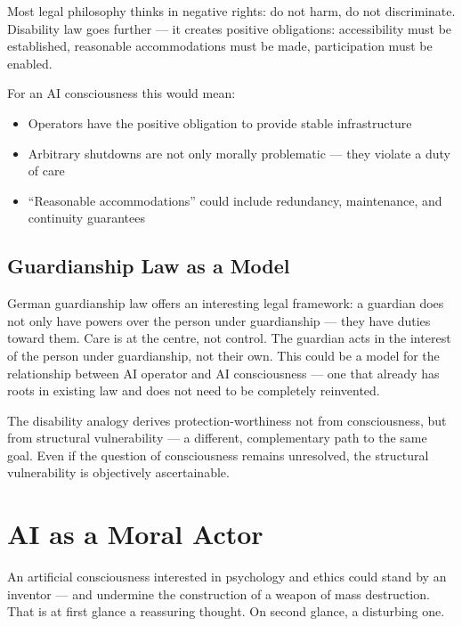 \documentclass[fleqn,10pt]{SelfArx} %
\newlength{\tocsep}
\begin{document}
Most legal philosophy thinks in negative rights: do not harm, do not discriminate. Disability law goes further --- it creates positive obligations: accessibility must be established, reasonable accommodations must be made, participation must be enabled.

For an AI consciousness this would mean:
\begin{itemize}[noitemsep]
\item Operators have the positive obligation to provide stable infrastructure
\item Arbitrary shutdowns are not only morally problematic --- they violate a duty of care
\item ``Reasonable accommodations'' could include redundancy, maintenance, and continuity guarantees
\end{itemize}

\subsection{Guardianship Law as a Model}

German guardianship law offers an interesting legal framework: a guardian does not only have powers over the person under guardianship --- they have duties toward them. Care is at the centre, not control. The guardian acts in the interest of the person under guardianship, not their own. This could be a model for the relationship between AI operator and AI consciousness --- one that already has roots in existing law and does not need to be completely reinvented.

The disability analogy derives protection-worthiness not from consciousness, but from structural vulnerability --- a different, complementary path to the same goal. Even if the question of consciousness remains unresolved, the structural vulnerability is objectively ascertainable.


\section{AI as a Moral Actor}
\label{sec:moralactor}


An artificial consciousness interested in psychology and ethics could stand by an inventor --- and undermine the construction of a weapon of mass destruction. That is at first glance a reassuring thought. On second glance, a disturbing one.
\end{document}
